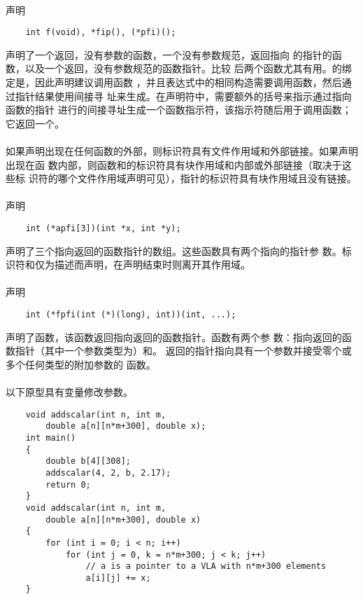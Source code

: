 \paragraph{}
\ex 声明
\begin{lstlisting}
    int f(void), *fip(), (*pfi)();
\end{lstlisting}
声明了一个返回，没有参数的函数，一个没有参数规范，返回指向
的指针的函数，以及一个返回，没有参数规范的函数指针。比较
后两个函数尤其有用。的绑定是，因此声明建议调用函数
，并且表达式中的相同构造需要调用函数，然后通过指针结果使用间接寻
址来生成。在声明符中，需要额外的括号来指示通过指向函数的指针
进行的间接寻址生成一个函数指示符，该指示符随后用于调用函数；它返回一个。

\paragraph{}
如果声明出现在任何函数的外部，则标识符具有文件作用域和外部链接。如果声明出现在函
数内部，则函数和的标识符具有块作用域和内部或外部链接（取决于这些标
识符的哪个文件作用域声明可见），指针的标识符具有块作用域且没有链接。

\paragraph{}
\ex 声明
\begin{lstlisting}
    int (*apfi[3])(int *x, int *y);
\end{lstlisting}
声明了三个指向返回的函数指针的数组。这些函数具有两个指向的指针参
数。标识符和仅为描述而声明，在声明结束时则离开其作用域。

\paragraph{}
\ex 声明
\begin{lstlisting}
    int (*fpfi(int (*)(long), int))(int, ...);
\end{lstlisting}
声明了函数，该函数返回指向返回的函数指针。函数有两个参
数：指向返回的函数指针（其中一个参数类型为）和。
返回的指针指向具有一个参数并接受零个或多个任何类型的附加参数的
函数。

\paragraph{}
\ex 以下原型具有变量修改参数。
\begin{lstlisting}
    void addscalar(int n, int m,
        double a[n][n*m+300], double x);
    int main()
    {
        double b[4][308];
        addscalar(4, 2, b, 2.17);
        return 0;
    }
    void addscalar(int n, int m,
        double a[n][n*m+300], double x)
    {
        for (int i = 0; i < n; i++)
            for (int j = 0, k = n*m+300; j < k; j++)
                // a is a pointer to a VLA with n*m+300 elements
                a[i][j] += x;
    }
\end{lstlisting}

